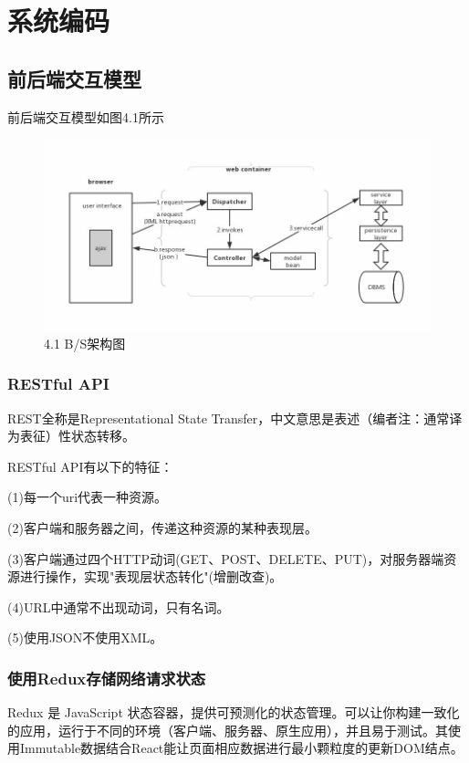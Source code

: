 \section{系统编码}

\subsection{前后端交互模型}

前后端交互模型如图4.1所示

\begin{figure}[thbp!]
	\centering
	\includegraphics[width=1.0\linewidth]{figure/BS_structure}
	\label{fig:BS_structure}  \\
		4.1 B/S架构图
\end{figure}

\subsubsection{RESTful API}

REST全称是Representational State Transfer，中文意思是表述（编者注：通常译为表征）性状态转移。

RESTful API有以下的特征：

(1)每一个uri代表一种资源。

(2)客户端和服务器之间，传递这种资源的某种表现层。

(3)客户端通过四个HTTP动词(GET、POST、DELETE、PUT)，对服务器端资源进行操作，实现"表现层状态转化"(增删改查)。

(4)URL中通常不出现动词，只有名词。

(5)使用JSON不使用XML。

\subsubsection{使用Redux存储网络请求状态}

Redux 是 JavaScript 状态容器，提供可预测化的状态管理。可以让你构建一致化的应用，运行于不同的环境（客户端、服务器、原生应用），并且易于测试。其使用Immutable数据结合React能让页面相应数据进行最小颗粒度的更新DOM结点。

